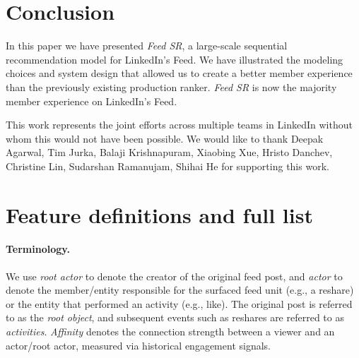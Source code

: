 \documentclass[sigconf]{acmart}
\newcommand{\systemname}{\textit{Feed SR}}
\begin{document}
\section{Conclusion}
In this paper we have presented {\systemname}, a large-scale sequential recommendation model for LinkedIn's Feed. We have illustrated the modeling choices and system design that allowed us to create a better member experience than the previously existing production ranker. {\systemname} is now the majority member experience on LinkedIn's Feed.

\begin{acks}
This work represents the joint efforts across multiple teams
in LinkedIn without whom this would not have been
possible. We would like to thank Deepak Agarwal, Tim Jurka, Balaji Krishnapuram, Xiaobing Xue, Hristo Danchev, Christine Lin, Sudarshan Ramanujam, Shihai He for supporting this work.
\end{acks}




\pagebreak
\appendix

\section{Feature definitions and full list}\label{app:features-cont}

\paragraph{Terminology.}
We use \emph{root actor} to denote the creator of the original feed post, and \emph{actor} to denote the member/entity responsible for the surfaced feed unit (e.g., a reshare) or the entity that performed an activity (e.g., like). The original post is referred to as the \emph{root object}, and subsequent events such as reshares are referred to as \emph{activities}. \emph{Affinity} denotes the connection strength between a viewer and an actor/root actor, measured via historical engagement signals.
\end{document}
